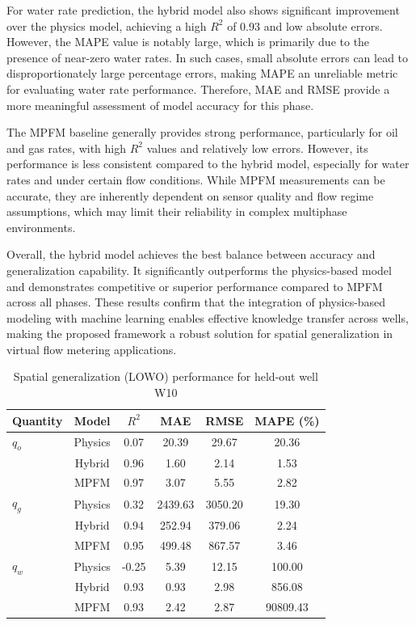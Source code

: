 \documentclass[12pt,APA]{uomthesis}
\begin{document}
For water rate prediction, the hybrid model also shows significant improvement over the physics model, achieving a high $R^2$ of 0.93 and low absolute errors. However, the MAPE value is notably large, which is primarily due to the presence of near-zero water rates. In such cases, small absolute errors can lead to disproportionately large percentage errors, making MAPE an unreliable metric for evaluating water rate performance. Therefore, MAE and RMSE provide a more meaningful assessment of model accuracy for this phase.

The MPFM baseline generally provides strong performance, particularly for oil and gas rates, with high $R^2$ values and relatively low errors. However, its performance is less consistent compared to the hybrid model, especially for water rates and under certain flow conditions. While MPFM measurements can be accurate, they are inherently dependent on sensor quality and flow regime assumptions, which may limit their reliability in complex multiphase environments.

Overall, the hybrid model achieves the best balance between accuracy and generalization capability. It significantly outperforms the physics-based model and demonstrates competitive or superior performance compared to MPFM across all phases. These results confirm that the integration of physics-based modeling with machine learning enables effective knowledge transfer across wells, making the proposed framework a robust solution for spatial generalization in virtual flow metering applications.


\begin{table}[!ht]
\centering
\caption{Spatial generalization (LOWO) performance for held-out well W10}
\label{tab:lowo}
\begin{tabular}{lccccc}
\hline
Quantity & Model & $R^2$ & MAE & RMSE & MAPE (\%) \\
\hline
$q_o$ & Physics & 0.07 & 20.39 & 29.67 & 20.36 \\
      & Hybrid  & 0.96 & 1.60  & 2.14  & 1.53 \\
      & MPFM    & 0.97 & 3.07  & 5.55  & 2.82 \\
\hline
$q_g$ & Physics & 0.32 & 2439.63 & 3050.20 & 19.30 \\
      & Hybrid  & 0.94 & 252.94  & 379.06  & 2.24 \\
      & MPFM    & 0.95 & 499.48  & 867.57  & 3.46 \\
\hline
$q_w$ & Physics & -0.25 & 5.39 & 12.15 & 100.00 \\
      & Hybrid  & 0.93  & 0.93 & 2.98  & 856.08 \\
      & MPFM    & 0.93  & 2.42 & 2.87  & 90809.43 \\
\hline
\end{tabular}
\end{table}
\end{document}
